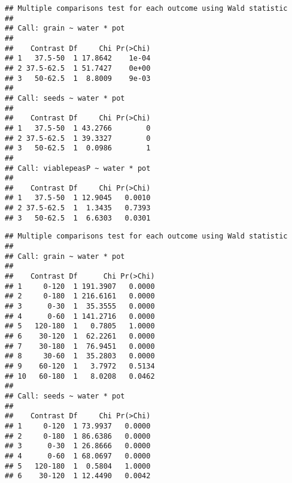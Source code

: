 \begin{knitrout}
\color{fgcolor}\begin{kframe}
\begin{alltt}
\hlstd{(} 
             \hlstd{=} \hlstd{(}\hlstd{(}\hlstd{),}
                          \hlstd{(}\hlstd{),}
                          \hlstd{(}\hlstd{)),}
             
\end{alltt}
\begin{verbatim}
## Multiple comparisons test for each outcome using Wald statistic
## 
## Call: grain ~ water * pot
## 
##    Contrast Df     Chi Pr(>Chi)
## 1   37.5-50  1 17.8642    1e-04
## 2 37.5-62.5  1 51.7427    0e+00
## 3   50-62.5  1  8.8009    9e-03
## 
## Call: seeds ~ water * pot
## 
##    Contrast Df     Chi Pr(>Chi)
## 1   37.5-50  1 43.2766        0
## 2 37.5-62.5  1 39.3327        0
## 3   50-62.5  1  0.0986        1
## 
## Call: viablepeasP ~ water * pot
## 
##    Contrast Df     Chi Pr(>Chi)
## 1   37.5-50  1 12.9045   0.0010
## 2 37.5-62.5  1  1.3435   0.7393
## 3   50-62.5  1  6.6303   0.0301
\end{verbatim}
\begin{alltt}
\hlstd{(} 
             \hlstd{=} \hlstd{(}\hlstd{(}\hlstd{),}
                          \hlstd{(}\hlstd{),}
                          \hlstd{(}\hlstd{)),}
             
\end{alltt}
\begin{verbatim}
## Multiple comparisons test for each outcome using Wald statistic
## 
## Call: grain ~ water * pot
## 
##    Contrast Df      Chi Pr(>Chi)
## 1     0-120  1 191.3907   0.0000
## 2     0-180  1 216.6161   0.0000
## 3      0-30  1  35.3555   0.0000
## 4      0-60  1 141.2716   0.0000
## 5   120-180  1   0.7805   1.0000
## 6    30-120  1  62.2261   0.0000
## 7    30-180  1  76.9451   0.0000
## 8     30-60  1  35.2803   0.0000
## 9    60-120  1   3.7972   0.5134
## 10   60-180  1   8.0208   0.0462
## 
## Call: seeds ~ water * pot
## 
##    Contrast Df     Chi Pr(>Chi)
## 1     0-120  1 73.9937   0.0000
## 2     0-180  1 86.6386   0.0000
## 3      0-30  1 26.8666   0.0000
## 4      0-60  1 68.0697   0.0000
## 5   120-180  1  0.5804   1.0000
## 6    30-120  1 12.4490   0.0042

\end{verbatim}
\end{kframe}
\end{knitrout}

